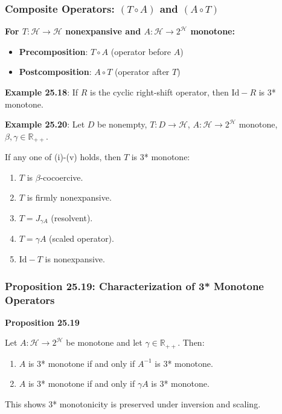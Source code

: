 \documentclass[aspectratio=169,10pt]{beamer}
\begin{document}
\begin{frame}
  \frametitle{Composite Operators: $(T \circ A)$ and $(A \circ T)$}

  \textbf{For $T: \mathcal{H} \to \mathcal{H}$ nonexpansive and $A: \mathcal{H} \to 2^{\mathcal{H}}$ monotone:}

  \begin{itemize}
    \item \textbf{Precomposition}: $T \circ A$ (operator before $A$)
    \item \textbf{Postcomposition}: $A \circ T$ (operator after $T$)
  \end{itemize}

  \vspace{0.3cm}

  \textbf{Example 25.18}: If $R$ is the cyclic right-shift operator, then $\text{Id} - R$ is 3* monotone.

  \vspace{0.3cm}

  \textbf{Example 25.20}:
  Let $D$ be nonempty, $T: D \to \mathcal{H}$, $A: \mathcal{H} \to 2^{\mathcal{H}}$ monotone, $\beta, \gamma \in \mathbb{R}_{++}$.

  If any one of (i)-(v) holds, then $T$ is 3* monotone:
  \begin{enumerate}
    \item[(i)] $T$ is $\beta$-cocoercive.
    \item[(ii)] $T$ is firmly nonexpansive.
    \item[(iii)] $T = J_{\gamma A}$ (resolvent).
    \item[(iv)] $T = \gamma A$ (scaled operator).
    \item[(v)] $\text{Id} - T$ is nonexpansive.
  \end{enumerate}

\end{frame}

\begin{frame}
  \frametitle{Proposition 25.19: Characterization of 3* Monotone Operators}

  \textbf{Proposition 25.19}

  Let $A: \mathcal{H} \to 2^{\mathcal{H}}$ be monotone and let $\gamma \in \mathbb{R}_{++}$. Then:

  \begin{enumerate}
    \item[(i)] $A$ is 3* monotone if and only if $A^{-1}$ is 3* monotone.
    \item[(ii)] $A$ is 3* monotone if and only if $\gamma A$ is 3* monotone.
  \end{enumerate}

  \vspace{0.3cm}

  This shows 3* monotonicity is preserved under inversion and scaling.

\end{frame}
\end{document}
